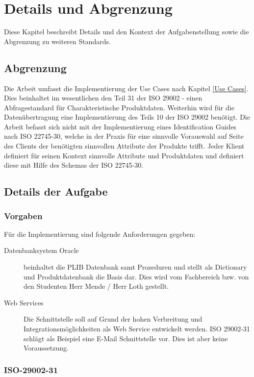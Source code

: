 \section{Details und Abgrenzung}

Diese Kapitel beschreibt Details und den Kontext der Aufgabenstellung sowie die Abgrenzung zu weiteren Standards.

\subsection{Abgrenzung}

Die Arbeit umfasst die Implementierung der Use Cases nach Kapitel \ref{Use Cases}. Dies beinhaltet im wesentlichen den Teil 31 der ISO 29002 - einen Abfragestandard für Charakteristische Produktdaten. Weiterhin wird für die Datenübertragung eine Implementierung des Teils 10 der ISO 29002 benötigt. Die Arbeit befasst sich nicht mit der Implementierung eines Identification Guides nach ISO 22745-30, welche in der Praxis für eine sinnvolle Vorauswahl auf Seite des Clients der benötigten sinnvollen Attribute der Produkte trifft. Jeder Klient definiert für seinen Kontext sinnvolle Attribute und Produktdaten und definiert diese mit Hilfe des Schemas der ISO 22745-30. 

\subsection{Details der Aufgabe}

\subsubsection{Vorgaben}

Für die Implementierung sind folgende Anforderungen gegeben:
\begin{description}
\item[Datenbanksystem Oracle] beinhaltet die PLIB Datenbank samt Prozeduren und stellt als Dictionary und Produktdatenbank die Basis dar. Dies wird vom Fachbereich bzw. von den Studenten Herr Mende / Herr Loth gestellt. 
\item[Web Services] Die Schnittstelle soll auf Grund der hohen Verbreitung und Integrationsmöglichkeiten als Web Service entwickelt werden. ISO 29002-31 schlägt als Beispiel eine E-Mail Schnittstelle vor.  Dies ist aber keine Voraussetzung. 
\end{description}

\subsubsection{ISO-29002-31}

